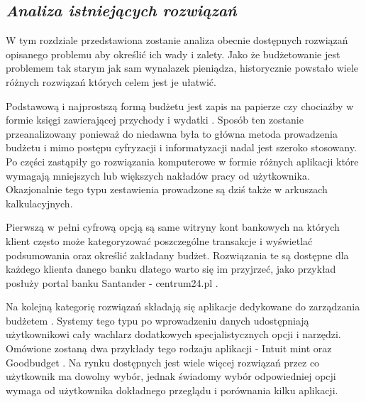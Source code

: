 \documentclass[a4paper,10pt, twoside]{report}
\newcommand{\customstylechapter}[1]{\large{\textit{#1}}}
\begin{document}
\begin{large}
\chapter{\customstylechapter{Analiza istniejących rozwiązań}}
{W tym rozdziale przedstawiona zostanie analiza obecnie dostępnych rozwiązań 
opisanego problemu aby określić ich wady i zalety. Jako że budżetowanie jest 
problemem tak starym jak sam wynalazek pieniądza, historycznie powstało wiele 
różnych rozwiązań których celem jest je ułatwić.}

{Podstawową i najprostszą formą budżetu jest zapis na papierze czy chociażby w 
formie księgi zawierającej przychody i wydatki \cite{o24_budzetowanie}. Sposób ten zostanie 
przeanalizowany ponieważ do niedawna była to główna metoda prowadzenia budżetu 
i mimo postępu cyfryzacji i informatyzacji nadal jest szeroko stosowany. Po 
części zastąpiły go rozwiązania komputerowe w formie różnych aplikacji które 
wymagają mniejszych lub większych nakładów pracy od użytkownika. Okazjonalnie 
tego typu zestawienia prowadzone są dziś także w arkuszach kalkulacyjnych.}

{Pierwszą w pełni cyfrową opcją są same witryny kont bankowych \cite{ingbudżet} 
na których klient często może kategoryzować poszczególne transakcje i wyświetlać
 podsumowania oraz określić zakładany budżet. Rozwiązania te są dostępne dla 
każdego klienta danego banku dlatego warto się im przyjrzeć, jako przykład 
posłuży portal banku Santander - centrum24.pl \cite{santandercentrum24}.}

{Na kolejną kategorię rozwiązań składają się aplikacje dedykowane do zarządzania
 budżetem \cite{budget}. Systemy tego typu po wprowadzeniu danych udostępniają 
użytkownikowi cały wachlarz dodatkowych specjalistycznych opcji i narzędzi. 
Omówione zostaną dwa przykłady tego rodzaju aplikacji - Intuit mint \cite{mint} 
oraz Goodbudget \cite{goodbudget}. Na rynku dostępnych jest wiele więcej 
rozwiązań przez co użytkownik ma dowolny wybór, jednak świadomy wybór 
odpowiedniej opcji wymaga od użytkownika dokładnego przeglądu i porównania kilku
 aplikacji.}


\end{large}
\end{document}

